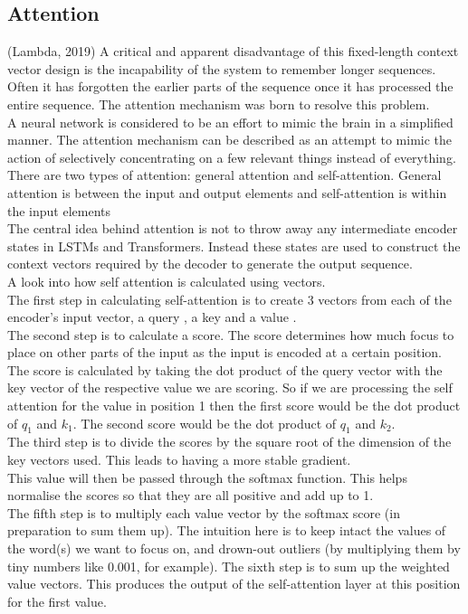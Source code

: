 \documentclass{article}
\begin{document}
\subsection{Attention}
(Lambda, 2019)
A critical and apparent disadvantage of this fixed-length context vector design is the incapability
of the system to remember longer sequences. Often it has forgotten the earlier parts of the
sequence once it has processed the entire sequence. The attention mechanism was born to resolve
this problem.\\
A neural network is considered to be an effort to mimic the brain in a simplified manner. The
attention mechanism can be described as an attempt to mimic the action of selectively
concentrating on a few relevant things instead of everything. There are two types of attention:
general attention and self-attention. General attention is between the input and output elements
and self-attention is within the input elements\\
The central idea behind attention is not to throw away any intermediate encoder states in LSTMs
and Transformers. Instead these states are used to construct the context vectors required by the
decoder to generate the output sequence.\\
A look into how self attention is calculated using vectors.\\
The first step in calculating self-attention is to create 3 vectors from each of the encoder’s input
vector, a query , a key  and a value .\\
The second step is to calculate a score. The score determines how much focus to place on other
parts of the input as the input is encoded at a certain position.\\
The score is calculated by taking the dot product of the query vector with the key vector of the
respective value we are scoring. So if we are processing the self attention for the value in position
1 then the first score would be the dot product of $q_1$ and $k_1$. The second score would be the dot
product of $q_1$ and $k_2$.\\
The third step is to divide the scores by the square root of the dimension of the key vectors used.
This leads to having a more stable gradient.\\
This value will then be passed through the softmax function. This helps normalise the scores so
that they are all positive and add up to 1.\\
The fifth step is to multiply each value vector by the softmax score (in preparation to sum them
up). The intuition here is to keep intact the values of the word(s) we want to focus on, and
drown-out outliers (by multiplying them by tiny numbers like 0.001, for example).
The sixth step is to sum up the weighted value vectors. This produces the output of the
self-attention layer at this position for the first value.
\end{document}
